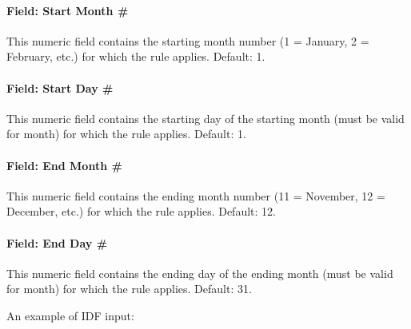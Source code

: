 \paragraph{Field: Start Month \#}\label{field-start-month-scheduleweekrule}

This numeric field contains the starting month number (1 = January, 2 = February, etc.) for which the rule applies.
Default: 1.

\paragraph{Field: Start Day \#}\label{field-date-start-day-scheduleweekrule}

This numeric field contains the starting day of the starting month (must be valid for month) for which the rule applies.
Default: 1.

\paragraph{Field: End Month \#}\label{field-end-month-scheduleweekrule}

This numeric field contains the ending month number (11 = November, 12 = December, etc.) for which the rule applies.
Default: 12.

\paragraph{Field: End Day \#}\label{field-end-day-scheduleweekrule}

This numeric field contains the ending day of the ending month (must be valid for month) for which the rule applies.
Default: 31.

An example of IDF input:

